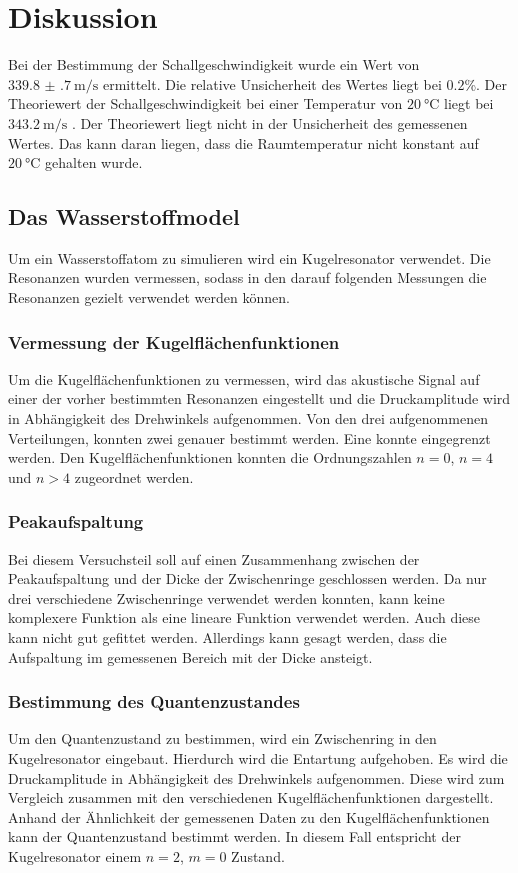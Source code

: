 \section{Diskussion}
\label{sec:Diskussion}
Bei der Bestimmung der Schallgeschwindigkeit wurde ein Wert von $\SI{339.8(7)}{\meter\per\second}$ ermittelt. 
Die relative Unsicherheit des Wertes liegt bei $\num{0.2}$\%. Der Theoriewert der Schallgeschwindigkeit bei einer Temperatur von
$\SI{20}{\celsius}$ liegt bei $\SI{343.2}{\meter\per\second}$ \cite{Schallgeschwindigkeit}. Der Theoriewert liegt nicht in der Unsicherheit des 
gemessenen Wertes. Das kann daran liegen, dass die Raumtemperatur nicht konstant auf $\SI{20}{\celsius}$ gehalten wurde.

\subsection{Das Wasserstoffmodel}
Um ein Wasserstoffatom zu simulieren wird ein Kugelresonator verwendet. Die Resonanzen wurden vermessen, sodass in den darauf 
folgenden Messungen die Resonanzen gezielt verwendet werden können.
\subsubsection{Vermessung der Kugelflächenfunktionen}
Um die Kugelflächenfunktionen zu vermessen, wird das akustische Signal auf einer der vorher bestimmten Resonanzen eingestellt 
und die Druckamplitude wird in Abhängigkeit des Drehwinkels aufgenommen.
Von den drei aufgenommenen Verteilungen, konnten zwei genauer bestimmt werden. Eine konnte eingegrenzt werden.
Den Kugelflächenfunktionen konnten die Ordnungszahlen $n=0$, $n=4$ und $n>4$ zugeordnet werden.
\subsubsection{Peakaufspaltung}
Bei diesem Versuchsteil soll auf einen Zusammenhang zwischen der Peakaufspaltung und der Dicke der Zwischenringe geschlossen werden.
Da nur drei verschiedene Zwischenringe verwendet werden konnten, kann keine komplexere Funktion als eine lineare Funktion 
verwendet werden. Auch diese kann nicht gut gefittet werden. Allerdings kann gesagt werden, dass die Aufspaltung im gemessenen Bereich
mit der Dicke ansteigt. 
\subsubsection{Bestimmung des Quantenzustandes}
Um den Quantenzustand zu bestimmen, wird ein Zwischenring in den Kugelresonator eingebaut. Hierdurch wird die 
Entartung aufgehoben. 
Es wird die Druckamplitude in Abhängigkeit des Drehwinkels aufgenommen. Diese wird zum Vergleich zusammen mit den verschiedenen
Kugelflächenfunktionen dargestellt.
Anhand der Ähnlichkeit der gemessenen Daten zu den Kugelflächenfunktionen kann der Quantenzustand bestimmt werden.
In diesem Fall entspricht der Kugelresonator einem $n=2$, $m=0$ Zustand.

